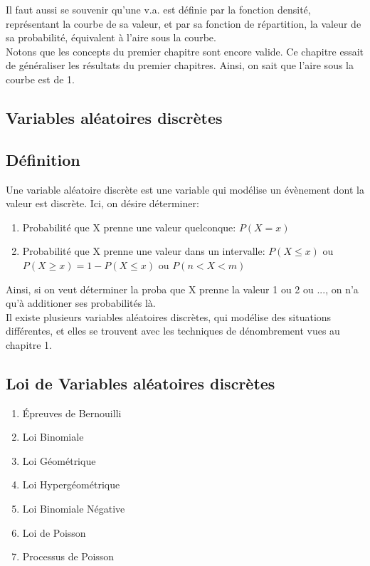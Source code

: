 \documentclass{article}
\begin{document}
Il faut aussi se souvenir qu'une v.a. est définie par la fonction densité,
représentant la courbe de sa valeur, et par sa fonction de répartition,
la valeur de sa probabilité, équivalent à l'aire sous la courbe.\\

Notons que les concepts du premier chapitre sont encore valide. Ce chapitre
essait de généraliser les résultats du premier chapitres. Ainsi, on
sait que l'aire sous la courbe est de 1.

\subsection{Variables aléatoires discrètes}

\subsection{Définition}

Une variable aléatoire discrète est une variable qui modélise un évènement
dont la valeur est discrète. Ici, on désire déterminer:
\begin{enumerate}
    \item Probabilité que X prenne une valeur quelconque: $ P(X = x)$
    \item Probabilité que X prenne une valeur dans un intervalle:
	$ P(X \leq x) $ ou $ P(X \geq x) = 1 - P(X \leq x)$ ou
	$ P(n < X < m) $
\end{enumerate}

Ainsi, si on veut déterminer la proba que X prenne la valeur 1 ou 2 ou ...,
on n'a qu'à additioner ses probabilités là.\\

Il existe plusieurs variables aléatoires discrètes, qui modélise des
situations différentes, et elles se trouvent avec les techniques de
dénombrement vues au chapitre 1.

\subsection{Loi de Variables aléatoires discrètes}

\begin{enumerate}
    \item Épreuves de Bernouilli
    \item Loi Binomiale
    \item Loi Géométrique
    \item Loi Hypergéométrique
    \item Loi Binomiale Négative
    \item Loi de Poisson
    \item Processus de Poisson
\end{enumerate}
\end{document}
